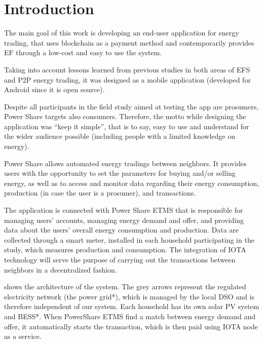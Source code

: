 \cleardoublepage
\label{chap:implement}
\section{Introduction} 

The main goal of this work is developing an end-user application for energy trading, that uses blockchain as a payment method and contemporarily provides \ac{EF} through a low-cost and easy to use the system.


Taking into account lessons learned from previous studies in both areas of \ac{EFS} and \ac{P2P} energy trading, it was designed as a mobile application (developed for Android since it is open source).



Despite all participants in the field study aimed at testing the app are prosumers, Power Share targets also consumers. Therefore, the motto while designing the application was “keep it simple”, that is to say, easy to use and understand for the wider audience possible (including people with a limited knowledge on energy).



Power Share allows automated energy tradings between neighbors. It provides users with the opportunity to set the parameters for buying and/or selling energy, as well as to access and monitor data regarding their energy consumption, production (in case the user is a prosumer), and transactions.



The application is connected with Power Share \ac{ETMS} that is responsible for managing users’ accounts, managing energy demand and offer, and providing data about the users’ overall energy consumption and production. Data are collected through a smart meter, installed in each household participating in the study, which measures production and consumption. The integration of IOTA technology will serve the purpose of carrying out the transactions between neighbors in a decentralized fashion.


 shows the architecture of the system. The grey arrows represent the regulated electricity network (the power grid*), which is managed by the local \ac{DSO} and is therefore independent of our system. Each household has its own solar PV system and BESS*. When PowerShare \ac{ETMS} find a match between energy demand and offer, it automatically starts the transaction, which is then paid using IOTA node as a service.  

